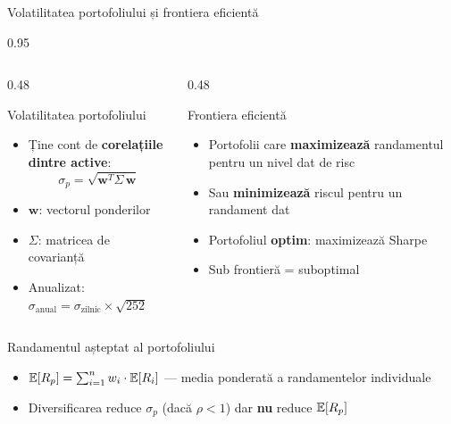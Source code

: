 \documentclass[9pt, aspectratio=169, t]{beamer}
\begin{document}
\begin{frame}[shrink=10]{Volatilitatea portofoliului și frontiera eficientă}
    \begin{cminipage}{0.95\textwidth}
    \begin{columns}[T]
    \begin{column}{0.48\textwidth}
    \begin{block}{Volatilitatea portofoliului}
    \begin{itemize}\setlength{\itemsep}{0pt}
        \item Ține cont de \textbf{corelațiile dintre active}:
        \[
        \sigma_p = \sqrt{\mathbf{w}^T \Sigma\, \mathbf{w}}
        \]
        \item $\mathbf{w}$: vectorul ponderilor
        \item $\Sigma$: matricea de covarianță
        \item Anualizat: $\sigma_{\text{anual}} = \sigma_{\text{zilnic}} \times \sqrt{252}$
    \end{itemize}
    \end{block}
    \end{column}
    \begin{column}{0.48\textwidth}
    \begin{exampleblock}{Frontiera eficientă}
    \begin{itemize}\setlength{\itemsep}{0pt}
        \item Portofolii care \textbf{maximizează} randamentul pentru un nivel dat de risc
        \item Sau \textbf{minimizează} riscul pentru un randament dat
        \item Portofoliul \textbf{optim}: maximizează Sharpe
        \item Sub frontieră = suboptimal
    \end{itemize}
    \end{exampleblock}
    \end{column}
    \end{columns}
    \vspace{0.2cm}
    \begin{alertblock}{Randamentul așteptat al portofoliului}
    \begin{itemize}\setlength{\itemsep}{0pt}
        \item $\mathbb{E}[R_p] = \sum_{i=1}^n w_i \cdot \mathbb{E}[R_i]$ --- media ponderată a randamentelor individuale
        \item Diversificarea reduce $\sigma_p$ (dacă $\rho < 1$) dar \textbf{nu} reduce $\mathbb{E}[R_p]$
    \end{itemize}
    \end{alertblock}
    \end{cminipage}
\end{frame}
\end{document}
